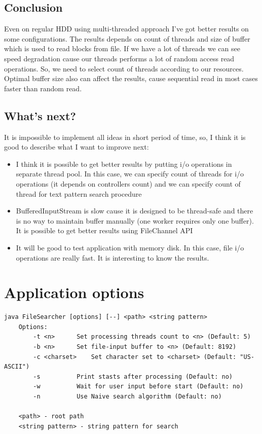 \documentclass[a4paper,12pt,final]{article}
\begin{document}
\subsection*{Conclusion}
Even on regular HDD using multi-threaded approach I've got better results on some configurations. The results depends on count of threads and size of buffer which is used to read blocks from file. If we have a lot of threads we can see speed degradation cause our threads performs a lot of random access read operations. So, we need to select count of threads according to our resources. Optimal buffer size also can affect the results, cause sequential read in most cases faster than random read.

\subsection*{What's next?}
It is impossible to implement all ideas in short period of time, so, I think it is good to describe what I want to improve next:
\begin{itemize}
\item I think it is possible to get better results by putting i/o operations in separate thread pool. In this case, we can specify count of threads for i/o operations (it depends on controllers count) and we can specify count of thread for text pattern search procedure
\item BufferedInputStream is slow cause it is designed to be thread-safe and there is no way to maintain buffer manually (one worker requires only one buffer). It is possible to get better results using FileChannel API
\item It will be good to test application with memory disk. In this case, file i/o operations are really fast. It is interesting to know the results.
\end{itemize}

\newpage
\section*{Application options}

\begin{verbatim}
java FileSearcher [options] [--] <path> <string pattern>
    Options:
        -t <n>  	Set processing threads count to <n> (Default: 5)
        -b <n>  	Set file-input buffer to <n> (Default: 8192)
        -c <charset>  	Set character set to <charset> (Default: "US-ASCII")
        -s      	Print stasts after processing (Default: no)
        -w      	Wait for user input before start (Default: no)
        -n      	Use Naive search algorithm (Default: no)

    <path> - root path
    <string pattern> - string pattern for search
\end{verbatim}
\end{document}

